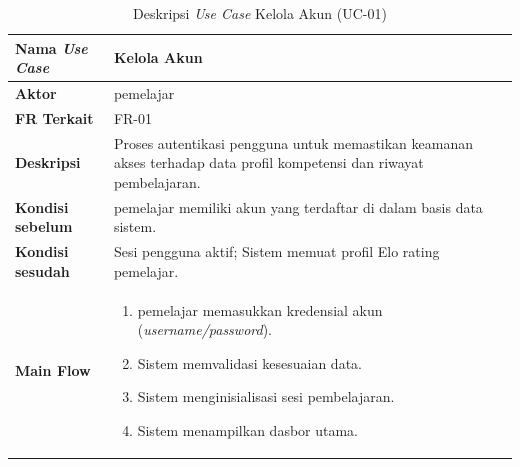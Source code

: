 \begin{table}[H]
    \centering
    \caption{Deskripsi \textit{Use Case} Kelola Akun (UC-01)}
    \label{tbl:desc_uc01}
    \begin{tabular}{|p{}|p{}|}
        \hline
        \textbf{Nama \textit{Use Case}} & \textbf{Kelola Akun} \\
        \hline
        \textbf{Aktor} & pemelajar \\
        \hline
        \textbf{FR Terkait} & FR-01 \\
        \hline
        \textbf{Deskripsi} & Proses autentikasi pengguna untuk memastikan keamanan akses terhadap data profil kompetensi dan riwayat pembelajaran. \\
        \hline
        \textbf{Kondisi sebelum} & pemelajar memiliki akun yang terdaftar di dalam basis data sistem. \\
        \hline
        \textbf{Kondisi sesudah} & Sesi pengguna aktif; Sistem memuat profil Elo rating pemelajar. \\
        \hline
        \textbf{Main Flow} & \begin{enumerate}[noitemsep,topsep=0pt,leftmargin=*]
            \item pemelajar memasukkan kredensial akun (\textit{username/password}).
            \item Sistem memvalidasi kesesuaian data.
            \item Sistem menginisialisasi sesi pembelajaran.
            \item Sistem menampilkan dasbor utama.
        \end{enumerate} \\
        \hline
    \end{tabular}
\end{table}